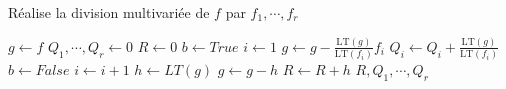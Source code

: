             \begin{algorithm}
                \caption{Réalise la division multivariée de $f$ par $f_1, \cdots, f_r$}
                \begin{algorithmic}
                        \State $g \gets f$
                        \State $Q_1, \cdots, Q_r \gets 0$
                        \State $R \gets 0$
                            \State $b \gets True$
                            \State $i \gets 1$
                                    \State $g \gets g - \frac{\mathrm{LT}(g)}{\mathrm{LT}(f_i)} f_i$
                                    \State $Q_i \gets Q_i + \frac{\mathrm{LT}(g)}{\mathrm{LT}(f_i)}$
                                    \State $b \gets False$
                                \EndIf
                                \State $i \gets i + 1$
                            \EndWhile
                                \State $h \gets LT(g)$
                                \State $g \leftarrow g - h$
                                \State $R \leftarrow R + h$
                            \EndIf
                        \EndWhile
                        \State \Return $R,Q_1, \cdots, Q_r$
                    \EndFunction
                \end{algorithmic}
            \end{algorithm}

            \cleardoublepage

